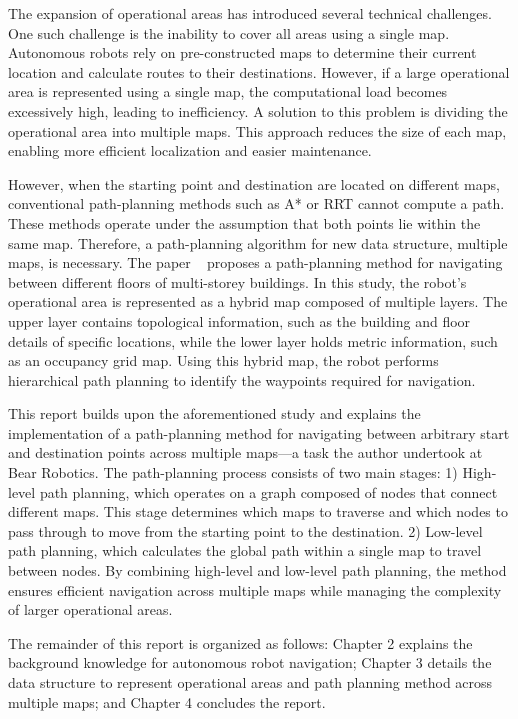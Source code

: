 \documentclass[en]{snu-cse-bsc-thesis}
\begin{document}
The expansion of operational areas has introduced several technical challenges. One such challenge is the inability to cover all areas using a single map. Autonomous robots rely on pre-constructed maps to determine their current location and calculate routes to their destinations. However, if a large operational area is represented using a single map, the computational load becomes excessively high, leading to inefficiency. A solution to this problem is dividing the operational area into multiple maps. This approach reduces the size of each map, enabling more efficient localization and easier maintenance. 

However, when the starting point and destination are located on different maps, conventional path-planning methods such as A* or RRT cannot compute a path. These methods operate under the assumption that both points lie within the same map. Therefore, a path-planning algorithm for new data structure, multiple maps, is necessary. The paper ~\cite{MultiStoreyBuildingNavigation} proposes a path-planning method for navigating between different floors of multi-storey buildings. In this study, the robot's operational area is represented as a hybrid map composed of multiple layers. The upper layer contains topological information, such as the building and floor details of specific locations, while the lower layer holds metric information, such as an occupancy grid map. Using this hybrid map, the robot performs hierarchical path planning to identify the waypoints required for navigation.

This report builds upon the aforementioned study and explains the implementation of a path-planning method for navigating between arbitrary start and destination points across multiple maps—a task the author undertook at Bear Robotics. The path-planning process consists of two main stages: 1) High-level path planning, which operates on a graph composed of nodes that connect different maps. This stage determines which maps to traverse and which nodes to pass through to move from the starting point to the destination. 2) Low-level path planning, which calculates the global path within a single map to travel between nodes. By combining high-level and low-level path planning, the method ensures efficient navigation across multiple maps while managing the complexity of larger operational areas.

The remainder of this report is organized as follows:
Chapter 2 explains the background knowledge for autonomous robot navigation; Chapter 3 details the data structure to represent operational areas and path planning method across multiple maps; and Chapter 4 concludes the report.
\end{document}
